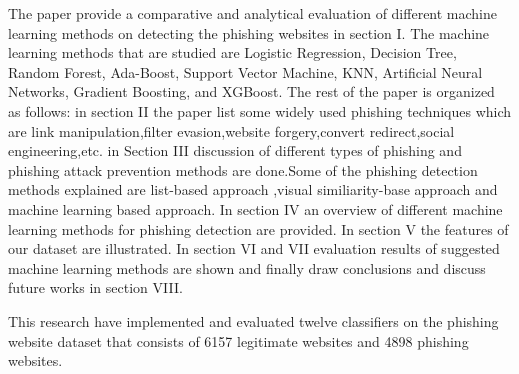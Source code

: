 The paper provide a comparative and analytical evaluation of different machine learning methods on detecting the phishing websites in section I. The machine learning methods that are studied are Logistic Regression, Decision Tree, Random Forest, Ada-Boost, Support Vector Machine, KNN, Artificial Neural Networks, Gradient Boosting, and XGBoost. The rest of the paper is organized as follows: in section II the paper list some widely used phishing techniques which are link manipulation,filter evasion,website forgery,convert redirect,social engineering,etc. in Section III discussion of different types of phishing and phishing attack prevention methods are done.Some of the phishing detection methods explained are list-based approach ,visual similiarity-base approach and machine learning based approach. In section IV an overview of different machine learning methods for phishing detection are provided. In section V  the features of our dataset are illustrated. In section VI and VII  evaluation results of suggested machine learning methods are shown and finally draw conclusions and discuss future works in section VIII.

 This research have implemented and evaluated twelve classifiers on the phishing website dataset that consists of 6157 legitimate websites and 4898 phishing websites.


